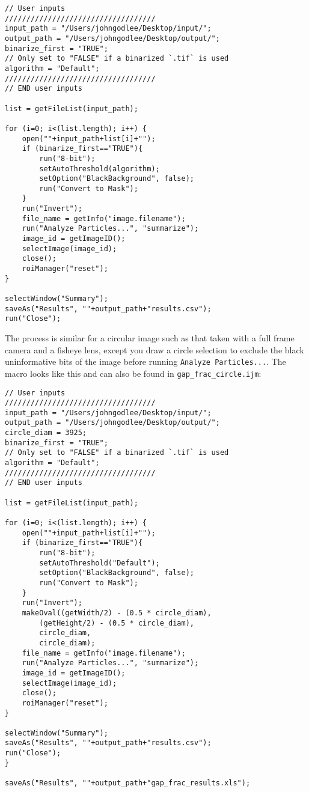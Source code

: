 \documentclass{article}
\begin{document}
\begin{lstlisting}[label=gap_frac_image, caption=ImageJ macro to calculate the gap fraction of a full image]
// User inputs
///////////////////////////////////
input_path = "/Users/johngodlee/Desktop/input/";
output_path = "/Users/johngodlee/Desktop/output/";
binarize_first = "TRUE";
// Only set to "FALSE" if a binarized `.tif` is used
algorithm = "Default";
///////////////////////////////////
// END user inputs

list = getFileList(input_path);

for (i=0; i<(list.length); i++) {
	open(""+input_path+list[i]+"");
	if (binarize_first=="TRUE"){
		run("8-bit");
		setAutoThreshold(algorithm);
		setOption("BlackBackground", false);
		run("Convert to Mask");
	}
	run("Invert");
	file_name = getInfo("image.filename");
	run("Analyze Particles...", "summarize");
	image_id = getImageID();
	selectImage(image_id);
	close();
	roiManager("reset");
}

selectWindow("Summary"); 
saveAs("Results", ""+output_path+"results.csv"); 
run("Close");
\end{lstlisting}

The process is similar for a circular image such as that taken with a full frame camera and a fisheye lens, except you draw a circle selection to exclude the black uninformative bits of the image before running \texttt{Analyze Particles...}. The macro looks like this and can also be found in \texttt{gap\_frac\_circle.ijm}:

\begin{lstlisting}[label=gap_frac_circle, caption=ImageJ macro to calculate the gap fraction of a circular selection of an image]
// User inputs
///////////////////////////////////
input_path = "/Users/johngodlee/Desktop/input/";
output_path = "/Users/johngodlee/Desktop/output/";
circle_diam = 3925;
binarize_first = "TRUE";
// Only set to "FALSE" if a binarized `.tif` is used
algorithm = "Default";
///////////////////////////////////
// END user inputs

list = getFileList(input_path);

for (i=0; i<(list.length); i++) {
	open(""+input_path+list[i]+"");
	if (binarize_first=="TRUE"){
		run("8-bit");
		setAutoThreshold("Default");
		setOption("BlackBackground", false);
		run("Convert to Mask");
	}
	run("Invert");
	makeOval((getWidth/2) - (0.5 * circle_diam),
		(getHeight/2) - (0.5 * circle_diam),
		circle_diam,
		circle_diam);
	file_name = getInfo("image.filename");
	run("Analyze Particles...", "summarize");
	image_id = getImageID();
	selectImage(image_id);
	close();
	roiManager("reset");
}

selectWindow("Summary"); 
saveAs("Results", ""+output_path+"results.csv"); 
run("Close");
}

saveAs("Results", ""+output_path+"gap_frac_results.xls");
\end{lstlisting}
\end{document}
